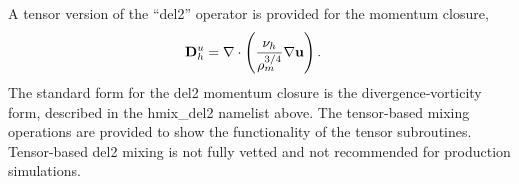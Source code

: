 A tensor version of the ``del2'' operator is provided for the momentum closure,
\begin{eqnarray}
\label{ocean:h_mom_del2_tensor}
& {\bf D}^u_h = \nabla\cdot\left( 
   \displaystyle\frac{\nu_h}{\rho_m^{3/4}} \nabla {\bf u}  \right).
\end{eqnarray}
The standard form for the del2 momentum closure is the divergence-vorticity form, described in the hmix\_del2 namelist above.  The tensor-based mixing operations are provided to show the functionality of the tensor subroutines.  Tensor-based del2 mixing is not fully vetted and not recommended for production simulations.
